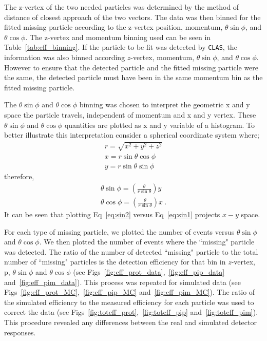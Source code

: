 \documentclass[11pt,a4paper]{article}
\newcommand{\abbr}[1]{\textsc{\texttt{#1}}}
\def\tables{/Users/michaelkunkel/WORK/GIT_HUB/Pi0_Papers/ANALYSIS_NOTE/tables}
\begin{document}
			
			The z-vertex of the two needed particles was determined by the method of distance of closest approach of the two vectors. The data was then binned for the fitted missing particle according to the z-vertex position, momentum, $\theta \sin\phi$, and $\theta \cos\phi$. The z-vertex and momentum binning used can be seen in Table~\ref{tab:eff_binning}. If the particle to be fit was detected by \abbr{CLAS}, the information was also binned according $z$-vertex, momentum, $\theta \sin\phi$, and $\theta \cos\phi$. However to ensure that the detected particle and the fitted missing particle were the same, the detected particle must have been in the same momentum bin as the fitted missing particle.
			
			The $\theta \sin\phi$ and $\theta \cos\phi$ binning was chosen to interpret the geometric x and y space the particle travels, independent of momentum and x and y vertex. These $\theta \sin\phi$ and $\theta \cos\phi$ quantities are plotted as x and y variable of a histogram. To better illustrate this interpretation consider a spherical coordinate system where;
			\begin{align}
				r=\sqrt{x^2 + y^2 + z^2} \\
				x = r\sin\theta\cos\phi \\
				y = r\sin\theta\sin\phi
			\end{align}
			therefore,
			\begin{align}
				\theta \sin\phi = \left(\frac{\theta}{r\sin\theta}\right)y \label{eq:sin1} \\
				\theta \cos\phi = \left(\frac{\theta}{r\sin\theta}\right)x \label{eq:sin2} \ .
			\end{align}
			It can be seen that plotting Eq~\ref{eq:sin2} versus Eq~\ref{eq:sin1} projects $x-y$ space.
			
			For each type of missing particle, we plotted the number of events versus $\theta \sin\phi$ and $\theta \cos\phi$. We then plotted the number of events where the ``missing" particle was detected. The ratio of the number of detected ``missing" particle to the total number of ``missing" particles is the detection efficiency for that bin in $z$-vertex, p, $\theta \sin\phi$ and $\theta \cos\phi$ (see Figs~\ref{fig:eff_prot_data},~\ref{fig:eff_pip_data} and~\ref{fig:eff_pim_data}). This process was repeated for simulated data (see Figs~\ref{fig:eff_prot_MC},~\ref{fig:eff_pip_MC} and~\ref{fig:eff_pim_MC}). The ratio of the simulated efficiency to the measured efficiency for each particle was used to correct the data (see Figs~\ref{fig:toteff_prot},~\ref{fig:toteff_pip} and~\ref{fig:toteff_pim}). This procedure revealed any differences between the real and simulated detector responses.
			\FloatBarrier
\end{document}
